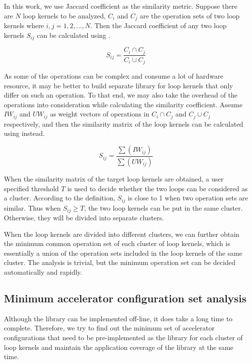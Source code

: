 In this work, we use Jaccard coefficient as the similarity metric. Suppose there are $N$ loop kernels to be analyzed, $C_i$ and $C_j$ are the operation sets of two loop kernels where $i,j=1,2,...,N$. Then the Jaccard coefficient of any two loop kernels $S_{ij}$ can be calculated using . 

\begin{equation} \label{eq:jaccard}
S_{ij}=\frac{C_i \cap C_j}{C_i \cup C_j}
\end{equation}

As some of the operations can be complex and consume a lot of hardware resource, it may be better to build separate library for loop kernels that only differ on such an operation. To that end, we may also take the overhead of the operations into consideration while calculating the similarity coefficient. Assume $IW_{ij}$ and $UW_{ij}$ as weight vectors of operations in $C_i \cap C_j$ and $C_j \cup C_j$ respectively, and then the similarity matrix of the loop kernels can be calculated using  instead.  

\begin{equation} \label{eq:wjaccard}
S_{ij}=\frac{\sum\nolimits(IW_{ij})}{\sum\nolimits(UW_{ij})}
\end{equation}

When the similarity matrix of the target loop kernels are obtained, a user specified threshold $T$ is used to decide whether the two loops can be considered as a cluster. According to the definition, $S_{ij}$ is close to 1 when two operation sets are similar. Thus when $S_{ij} \ge T$, the two loop kernels can be put in the same cluster. Otherwise, they will be divided into separate clusters.

When the loop kernels are divided into different clusters, we can further obtain the minimum common operation set of each cluster of loop kernels, which is essentially a union of the operation sets included in the loop kernels of the same cluster. The analysis is trivial, but the minimum operation set can be decided automatically and rapidly.

\subsection{Minimum accelerator configuration set analysis}
Although the library can be implemented off-line, it does take a long time to complete. Therefore, we try to find out the minimum set of accelerator configurations that need to be pre-implemented as the library for each cluster of loop kernels and maintain the application coverage of the library at the same time. 

